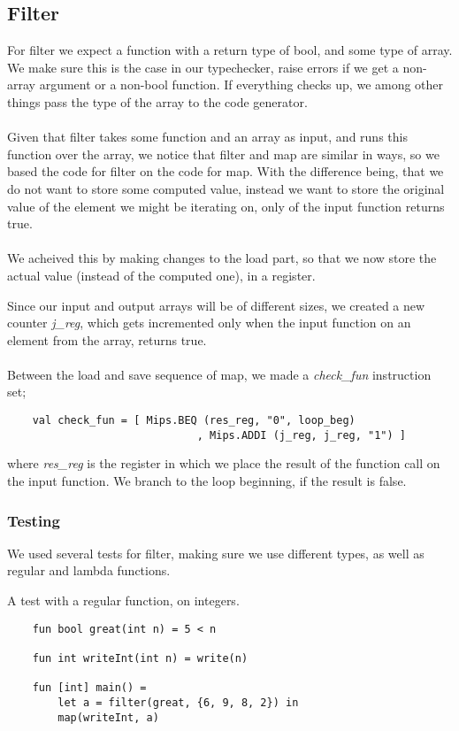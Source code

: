 \documentclass[paper=a4, fontsize=11pt]{scrartcl} %
\numberwithin{equation}{section} %
\numberwithin{figure}{section} %
\numberwithin{table}{section} %
\begin{document}
	\subsection{Filter}
	For filter we expect a function with a return type of bool, and some type of array. We make sure this is the case in our typechecker, raise errors if we get a non-array argument or a non-bool function. If everything checks up, we among other things pass the type of the array to the code generator.
	\\\\
	Given that filter takes some function and an array as input, and runs this function over the array, we notice that filter and map are similar in ways, so we based the code for filter on the code for map. With the difference being, that we do not want to store some computed value, instead we want to store the original value of the element we might be iterating on, only of the input function returns true.
	\\\\
	We acheived this by making changes to the load part, so that we now store the actual value (instead of the computed one), in a register.
	
	Since our input and output arrays will be of different sizes, we created a new counter \textit{j\_reg}, which gets incremented only when the input function on an element from the array, returns true.
	\\\\
	Between the load and save sequence of map, we made a \textit{check\_fun} instruction set;
	
	\begin{lstlisting}
	val check_fun = [ Mips.BEQ (res_reg, "0", loop_beg)
	                          , Mips.ADDI (j_reg, j_reg, "1") ]
	\end{lstlisting}
	where \textit{res\_reg} is the register in which we place the result of the function call on the input function. We branch to the loop beginning, if the result is false.

	\subsubsection{Testing}
	We used several tests for filter, making sure we use different types, as well as regular and lambda functions.
	
	A test with a regular function, on integers.
	\begin{lstlisting}
	fun bool great(int n) = 5 < n

	fun int writeInt(int n) = write(n)

	fun [int] main() =
  		let a = filter(great, {6, 9, 8, 2}) in
  		map(writeInt, a)
	\end{lstlisting}
\end{document}
